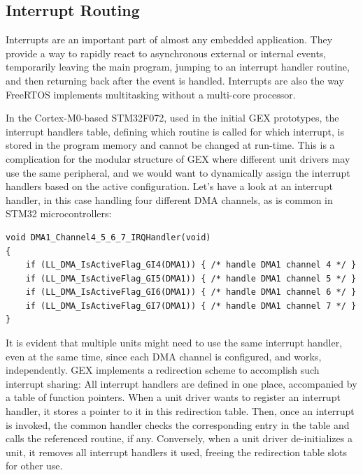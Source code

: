 \subsection{Interrupt Routing} \label{sec:irq-routing}

Interrupts are an important part of almost any embedded application. They provide a way to rapidly react to asynchronous external or internal events, temporarily leaving the main program, jumping to an interrupt handler routine, and then returning back after the event is handled. Interrupts are also the way FreeRTOS implements multitasking without a multi-core processor.

In the Cortex-M0-based STM32F072, used in the initial GEX prototypes, the interrupt handlers table, defining which routine is called for which interrupt, is stored in the program memory and cannot be changed at run-time. This is a complication for the modular structure of GEX where different unit drivers may use the same peripheral, and we would want to dynamically assign the interrupt handlers based on the active configuration. Let's have a look at an interrupt handler, in this case handling four different \gls{DMA} channels, as is common in STM32 microcontrollers:

\begin{verbatim}
void DMA1_Channel4_5_6_7_IRQHandler(void)
{
    if (LL_DMA_IsActiveFlag_GI4(DMA1)) { /* handle DMA1 channel 4 */ }
    if (LL_DMA_IsActiveFlag_GI5(DMA1)) { /* handle DMA1 channel 5 */ }
    if (LL_DMA_IsActiveFlag_GI6(DMA1)) { /* handle DMA1 channel 6 */ }
    if (LL_DMA_IsActiveFlag_GI7(DMA1)) { /* handle DMA1 channel 7 */ }
}
\end{verbatim}

It is evident that multiple units might need to use the same interrupt handler, even at the same time, since each \gls{DMA} channel is configured, and works, independently. GEX implements a redirection scheme to accomplish such interrupt sharing: All interrupt handlers are defined in one place, accompanied by a table of function pointers. When a unit driver wants to register an interrupt handler, it stores a pointer to it in this redirection table. Then, once an interrupt is invoked, the common handler checks the corresponding entry in the table and calls the referenced routine, if any. Conversely, when a unit driver de-initializes a unit, it removes all interrupt handlers it used, freeing the redirection table slots for other use.











